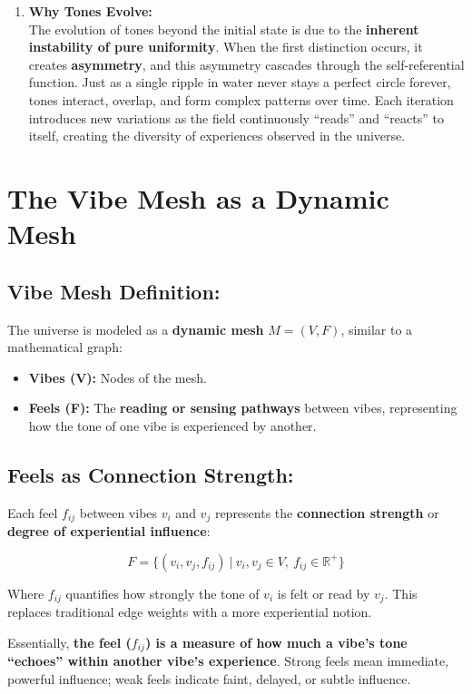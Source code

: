 \documentclass{article}
\begin{document}
\begin{enumerate}
\item \textbf{Why Tones Evolve:}\\
The evolution of tones beyond the initial state is due to the \textbf{inherent instability of pure uniformity}. When the first distinction occurs, it creates \textbf{asymmetry}, and this asymmetry cascades through the self-referential function. Just as a single ripple in water never stays a perfect circle forever, tones interact, overlap, and form complex patterns over time. Each iteration introduces new variations as the field continuously ``reads'' and ``reacts'' to itself, creating the diversity of experiences observed in the universe.
\end{enumerate}

\section{The Vibe Mesh as a Dynamic Mesh}

\subsection{Vibe Mesh Definition:}

The universe is modeled as a \textbf{dynamic mesh} $M = (V, F)$, similar to a mathematical graph:

\begin{itemize}
\item \textbf{Vibes (V):} Nodes of the mesh.
\item \textbf{Feels (F):} The \textbf{reading or sensing pathways} between vibes, representing how the tone of one vibe is experienced by another.
\end{itemize}

\subsection{Feels as Connection Strength:}

Each feel $f_{ij}$ between vibes $v_i$ and $v_j$ represents the \textbf{connection strength} or \textbf{degree of experiential influence}:

\[
F = \{ (v_i, v_j, f_{ij}) \ | \ v_i, v_j \in V, \ f_{ij} \in \mathbb{R}^+ \}
\]

Where $f_{ij}$ quantifies how strongly the tone of $v_i$ is felt or read by $v_j$. This replaces traditional edge weights with a more experiential notion.

Essentially, \textbf{the feel ($f_{ij}$) is a measure of how much a vibe's tone ``echoes'' within another vibe's experience}. Strong feels mean immediate, powerful influence; weak feels indicate faint, delayed, or subtle influence.
\end{document}
